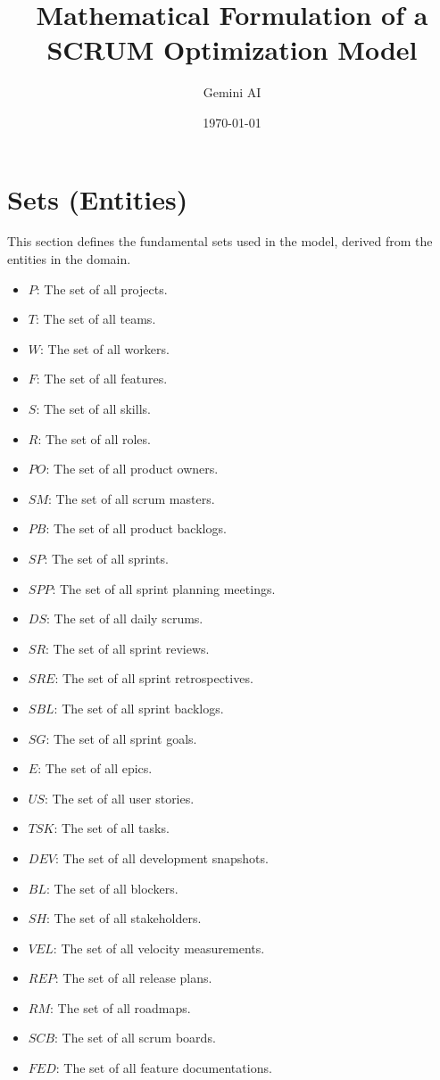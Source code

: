 \documentclass{article}
\title{Mathematical Formulation of a SCRUM Optimization Model}
\author{Gemini AI}
\date{\today}
\begin{document}
\maketitle
\tableofcontents
\newpage

\section{Sets (Entities)}
\label{sec:sets}
This section defines the fundamental sets used in the model, derived from the entities in the domain.
\begin{itemize}
    \item $P$: The set of all projects.
    \item $T$: The set of all teams.
    \item $W$: The set of all workers.
    \item $F$: The set of all features.
    \item $S$: The set of all skills.
    \item $R$: The set of all roles.
    \item $PO$: The set of all product owners.
    \item $SM$: The set of all scrum masters.
    \item $PB$: The set of all product backlogs.
    \item $SP$: The set of all sprints.
    \item $SPP$: The set of all sprint planning meetings.
    \item $DS$: The set of all daily scrums.
    \item $SR$: The set of all sprint reviews.
    \item $SRE$: The set of all sprint retrospectives.
    \item $SBL$: The set of all sprint backlogs.
    \item $SG$: The set of all sprint goals.
    \item $E$: The set of all epics.
    \item $US$: The set of all user stories.
    \item $TSK$: The set of all tasks.
    \item $DEV$: The set of all development snapshots.
    \item $BL$: The set of all blockers.
    \item $SH$: The set of all stakeholders.
    \item $VEL$: The set of all velocity measurements.
    \item $REP$: The set of all release plans.
    \item $RM$: The set of all roadmaps.
    \item $SCB$: The set of all scrum boards.
    \item $FED$: The set of all feature documentations.
\end{itemize}
\end{document}
